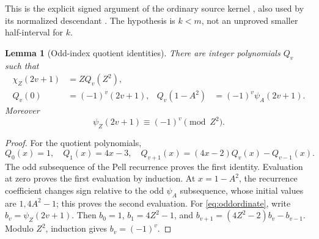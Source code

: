 \documentclass[11pt,a4paper]{article}
\newtheorem{lemma}[theorem]{Lemma}
\theoremstyle{definition}
\theoremstyle{remark}
\begin{document}
This is the explicit signed argument of the ordinary source kernel
\cite[Section 5]{ordinary}, also used by its normalized descendant
\cite[Section 5]{source38}. The hypothesis is \(k<m\), not an unproved
smaller half-interval for \(k\).

\begin{lemma}[Odd-index quotient identities]
\label{lem:odd}
There are integer polynomials \(Q_v\) such that
\begin{align}
 \chi_Z(2v+1)&=ZQ_v(Z^2), \nonumber\\
 Q_v(0)&=(-1)^v(2v+1),&
 Q_v(1-A^2)&=(-1)^v\psi_A(2v+1).             \label{eq:oddidentities}
\end{align}
Moreover
\begin{equation}
 \psi_Z(2v+1)\equiv(-1)^v\pmod{Z^2}.        \label{eq:oddordinate}
\end{equation}
\end{lemma}
\begin{proof}
For the quotient polynomials,
\[
 Q_0(x)=1,\quad Q_1(x)=4x-3,\quad
 Q_{v+1}(x)=(4x-2)Q_v(x)-Q_{v-1}(x).
\]
The odd subsequence of the Pell recurrence proves the first identity.
Evaluation at zero proves the first evaluation by induction.
At \(x=1-A^2\), the recurrence coefficient changes sign relative to
the odd \(\psi_A\) subsequence, whose initial values are
\(1,4A^2-1\); this proves the second evaluation.
For \eqref{eq:oddordinate}, write \(b_v=\psi_Z(2v+1)\).
Then \(b_0=1\), \(b_1=4Z^2-1\), and
\(b_{v+1}=(4Z^2-2)b_v-b_{v-1}\). Modulo \(Z^2\), induction gives
\(b_v=(-1)^v\).
\end{proof}
\end{document}
